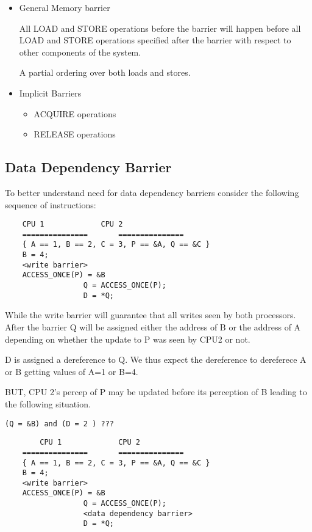 \documentclass{article}
\begin{document}
\begin{itemize}
  
  
\item General Memory barrier

  All LOAD and STORE operations before the barrier will happen before
  all LOAD and STORE operations specified after the barrier with
  respect to other components of the system.

  A partial ordering over both loads and stores.  

\item Implicit Barriers
  \begin{itemize}
  \item ACQUIRE operations
  \item RELEASE operations
  \end{itemize}
\end{itemize}


\subsection{Data Dependency Barrier}

To better understand need for data dependency barriers consider 
the following sequence of instructions:

\begin{lstlisting}
	CPU 1		      CPU 2
	===============	      ===============
	{ A == 1, B == 2, C = 3, P == &A, Q == &C }
	B = 4;
	<write barrier>
	ACCESS_ONCE(P) = &B
			      Q = ACCESS_ONCE(P);
			      D = *Q;
\end{lstlisting}

While the write barrier will guarantee that all writes seen by both
processors.  After the barrier Q will be assigned either the address
of B or the address of A depending on whether the update to P was seen
by CPU2 or not.

D is assigned a dereference to Q. We thus expect the dereference to
dereferece A or B getting values of A=1 or B=4.

BUT, CPU 2's percep of P may be updated before its perception of B
leading to the following situation.

\begin{lstlisting}
(Q = &B) and (D = 2 ) ???
\end{lstlisting}




\begin{lstlisting}
        CPU 1		      CPU 2
	===============	      ===============
	{ A == 1, B == 2, C = 3, P == &A, Q == &C }
	B = 4;
	<write barrier>
	ACCESS_ONCE(P) = &B
			      Q = ACCESS_ONCE(P);
			      <data dependency barrier>
			      D = *Q;  
\end{lstlisting}
\end{document}
